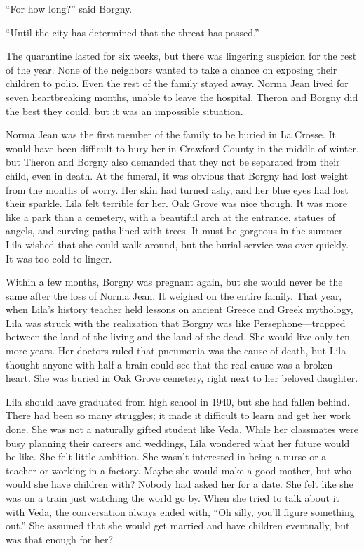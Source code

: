 \documentclass[
  american,
  letterpaper,
]{book}
\begin{document}
``For how long?'' said Borgny.

``Until the city has determined that the threat has passed.''

The quarantine lasted for six weeks, but there was lingering suspicion
for the rest of the year. None of the neighbors wanted to take a chance
on exposing their children to polio. Even the rest of the family stayed
away. Norma Jean lived for seven heartbreaking months, unable to leave
the hospital. Theron and Borgny did the best they could, but it was an
impossible situation.

Norma Jean was the first member of the family to be buried in La Crosse.
It would have been difficult to bury her in Crawford County in the
middle of winter, but Theron and Borgny also demanded that they not be
separated from their child, even in death. At the funeral, it was
obvious that Borgny had lost weight from the months of worry. Her skin
had turned ashy, and her blue eyes had lost their sparkle. Lila felt
terrible for her. Oak Grove was nice though. It was more like a park
than a cemetery, with a beautiful arch at the entrance, statues of
angels, and curving paths lined with trees. It must be gorgeous in the
summer. Lila wished that she could walk around, but the burial service
was over quickly. It was too cold to linger.

Within a few months, Borgny was pregnant again, but she would never be
the same after the loss of Norma Jean. It weighed on the entire family.
That year, when Lila's history teacher held lessons on ancient Greece
and Greek mythology, Lila was struck with the realization that Borgny
was like Persephone---trapped between the land of the living and the
land of the dead. She would live only ten more years. Her doctors ruled
that pneumonia was the cause of death, but Lila thought anyone with half
a brain could see that the real cause was a broken heart. She was buried
in Oak Grove cemetery, right next to her beloved daughter.

Lila should have graduated from high school in 1940, but she had fallen
behind. There had been so many struggles; it made it difficult to learn
and get her work done. She was not a naturally gifted student like Veda.
While her classmates were busy planning their careers and weddings, Lila
wondered what her future would be like. She felt little ambition. She
wasn't interested in being a nurse or a teacher or working in a factory.
Maybe she would make a good mother, but who would she have children
with? Nobody had asked her for a date. She felt like she was on a train
just watching the world go by. When she tried to talk about it with
Veda, the conversation always ended with, ``Oh silly, you'll figure
something out.'' She assumed that she would get married and have
children eventually, but was that enough for her?
\end{document}
